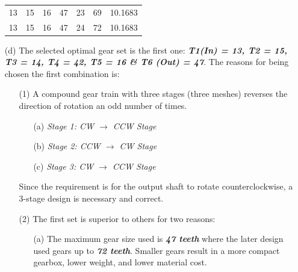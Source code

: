 \documentclass[12pt]{article}
\begin{document}
\begin{itemize}
\begin{table}[H]
\begin{tabular}{ccccccc}
                  13                        & 15                   & 16                   & 47                   & 23                   & 69                         & 10.1683                            \\
                  13                        & 15                   & 16                   & 47                   & 24                   & 72                         & 10.1683                            \\
              \end{tabular}
          \end{table}

    \item [(d)] The selected optimal gear set is the first one: \textit{\textbf{T1(In) = 13, T2 = 15, T3 = 14, T4 = 42, T5 = 16 \& T6 (Out) = 47}}. The reasons for being chosen the first combination is:

          \begin{itemize}

              \item [(1)] A compound gear train with three stages (three meshes) reverses the direction of rotation an odd number of times.

                    \begin{itemize}
                        \item [(a)] \textit{Stage 1: CW $\rightarrow$ CCW Stage}
                        \item [(b)] \textit{Stage 2: CCW $\rightarrow$ CW Stage}
                        \item [(c)] \textit{Stage 3: CW $\rightarrow$ CCW Stage}
                    \end{itemize}

                    Since the requirement is for the output shaft to rotate counterclockwise, a 3-stage design is necessary and correct.

              \item [(2)] The first set is superior to others for two reasons:

                    \begin{itemize}

                        \item [(a)] The maximum gear size used is \textit{\textbf{47 teeth}} where the later design used gears up to \textit{\textbf{72 teeth}}. Smaller gears result in a more compact gearbox, lower weight, and lower material cost.


\end{itemize}
\end{itemize}
\end{itemize}
\end{document}
